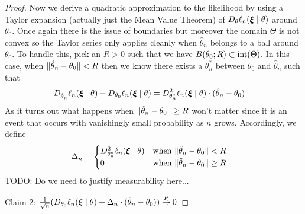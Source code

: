 \begin{proof}
Now we derive a quadratic approximation to the likelihood by using a
Taylor expansion (actually just the Mean Value Theorem) of
$D_\theta \ell_n(\boldsymbol{\xi} \mid \theta)$ around ${\theta}_0$.  Once
again there is the issue of boundaries but moreover  the domain
$\Theta$ is not convex so the Taylor series only applies cleanly when
$\hat{\theta}_n$ belongs to a ball around $\theta_0$.  To handle this,
pick an $R > 0$ such that we have $B(\theta_0; R) \subset
\operatorname*{int}(\Theta)$.  In this case, when $\lVert \hat{\theta}_n -
  \theta_0 \rVert < R$ then we know there exists a $\theta^*_n$ between $\theta_0$ and
$\hat{\theta}_n$ such that 
\begin{align*}
D_{\hat{\theta}_n} \ell_n(\boldsymbol{\xi} \mid \theta) - D_{\theta_0} \ell_n(\boldsymbol{\xi}
\mid \theta) &= D^2_{\theta^*_n} \ell_n(\boldsymbol{\xi} \mid \theta) \cdot
(\hat{\theta}_n - \theta_0)
\end{align*}
As it turns out what happens when $\lVert \hat{\theta}_n - \theta_0 \rVert
\geq R$ won't matter since it is an event that occurs with vanishingly
small probability as $n$ grows.  Accordingly, we define
\begin{align*}
\Delta_n &= \begin{cases}
 D^2_{\theta^*_n} \ell_n(\boldsymbol{\xi} \mid \theta) & \text{when $\lVert \hat{\theta}_n -
  \theta_0 \rVert < R$} \\
0 & \text{when $\lVert \hat{\theta}_n -
  \theta_0 \rVert \geq R$} \\
\end{cases}
\end{align*}
TODO: Do we need to justify measurability here...

Claim 2: $ \frac{1}{\sqrt{n}}(D_{\theta_0} \ell_n(\boldsymbol{\xi}
\mid \theta) + \Delta_n \cdot (\hat{\theta}_n - \theta_0)) \overset{P}\to 0$


\end{proof}
